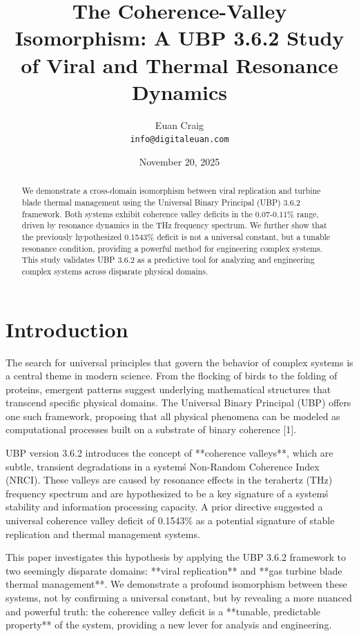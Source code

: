 \documentclass[11pt,a4paper]{article}
\title{The Coherence-Valley Isomorphism: A UBP 3.6.2 Study of Viral and Thermal Resonance Dynamics}
\author{Euan Craig \\ \texttt{info@digitaleuan.com}}
\date{November 20, 2025}
\begin{document}
\maketitle

\begin{abstract}
We demonstrate a cross-domain isomorphism between viral replication and turbine blade thermal management using the Universal Binary Principal (UBP) 3.6.2 framework. Both systems exhibit coherence valley deficits in the 0.07-0.11\% range, driven by resonance dynamics in the THz frequency spectrum. We further show that the previously hypothesized 0.1543\% deficit is not a universal constant, but a tunable resonance condition, providing a powerful method for engineering complex systems. This study validates UBP 3.6.2 as a predictive tool for analyzing and engineering complex systems across disparate physical domains.
\end{abstract}

\section{Introduction}

The search for universal principles that govern the behavior of complex systems is a central theme in modern science. From the flocking of birds to the folding of proteins, emergent patterns suggest underlying mathematical structures that transcend specific physical domains. The Universal Binary Principal (UBP) offers one such framework, proposing that all physical phenomena can be modeled as computational processes built on a substrate of binary coherence [1].

UBP version 3.6.2 introduces the concept of **coherence valleys**, which are subtle, transient degradations in a system\'s Non-Random Coherence Index (NRCI). These valleys are caused by resonance effects in the terahertz (THz) frequency spectrum and are hypothesized to be a key signature of a system\'s stability and information processing capacity. A prior directive suggested a universal coherence valley deficit of 0.1543\% as a potential signature of stable replication and thermal management systems.

This paper investigates this hypothesis by applying the UBP 3.6.2 framework to two seemingly disparate domains: **viral replication** and **gas turbine blade thermal management**. We demonstrate a profound isomorphism between these systems, not by confirming a universal constant, but by revealing a more nuanced and powerful truth: the coherence valley deficit is a **tunable, predictable property** of the system, providing a new lever for analysis and engineering.
\end{document}
